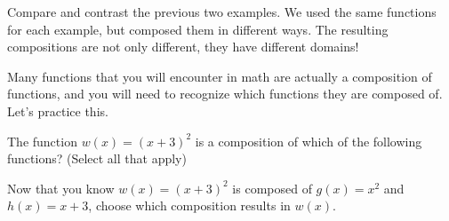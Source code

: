 \documentclass{ximera}
\begin{document}
Compare and contrast the previous two examples.  We used the same
functions for each example, but composed them in different ways.  The resulting
compositions are not only different, they have different domains!

Many functions that you will encounter in math are actually a composition of functions, and you will need to recognize which functions they are composed of.  Let's practice this.

\begin{problem}

    The function $w(x) = (x+3)^2$ is a composition of which of the following functions?  (Select all that apply)
    
        \begin{selectAll}
        \end{selectAll}
        
    \begin{problem}
        Now that you know $w(x) = (x+3)^2$ is composed of $g(x) = x^2$ and $h(x) = x+3$, choose which composition results in $w(x)$. 
        
            \begin{multipleChoice}
            \end{multipleChoice}
    \end{problem}

\end{problem}
\end{document}
